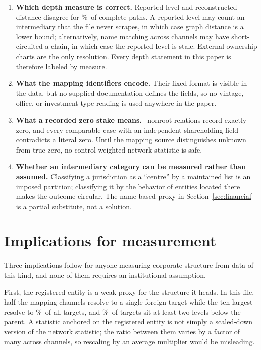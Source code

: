 \documentclass[11pt]{article}
\newcommand{\pct}{\%}
\begin{document}
\begin{enumerate}
  \item \textbf{Which depth measure is correct.} Reported level and
  reconstructed distance disagree for \DepthMismatchPct\pct\ of complete paths.
  A reported level may count an intermediary that the file never scrapes, in
  which case graph distance is a lower bound; alternatively, name matching
  across channels may have short-circuited a chain, in which case the reported
  level is stale. External ownership charts are the only resolution. Every
  depth statement in this paper is therefore labeled by measure.
  \item \textbf{What the mapping identifiers encode.} Their fixed format is
  visible in the data, but no supplied documentation defines the fields, so no
  vintage, office, or investment-type reading is used anywhere in the paper.
  \item \textbf{What a recorded zero stake means.} \ZeroStakeCount\ nonroot
  relations record exactly zero, and every comparable case with an independent
  shareholding field contradicts a literal zero. Until the mapping source
  distinguishes unknown from true zero, no control-weighted network statistic
  is safe.
  \item \textbf{Whether an intermediary category can be measured rather than
  assumed.} Classifying a jurisdiction as a ``centre'' by a maintained list is
  an imposed partition; classifying it by the behavior of entities located
  there makes the outcome circular. The name-based proxy in
  Section~\ref{sec:financial} is a partial substitute, not a solution.
\end{enumerate}

\section{Implications for measurement}
\label{sec:implications}

Three implications follow for anyone measuring corporate structure from data of
this kind, and none of them requires an institutional assumption.

First, the registered entity is a weak proxy for the structure it heads. In
this file, half the mapping channels resolve to a single foreign target while
the ten largest resolve to \TopTenUinPct\pct\ of all targets, and
\DepthTwoPlusPct\pct\ of targets sit at least two levels below the parent. A
statistic anchored on the registered entity is not simply a scaled-down version
of the network statistic; the ratio between them varies by a factor of many
across channels, so rescaling by an average multiplier would be misleading.
\end{document}
